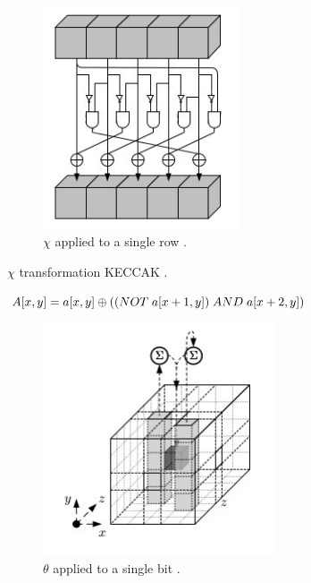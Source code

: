   \begin{figure}
    \begin{center}
      \includegraphics[width=2.3in]{keccakchi.jpg}
    \end{center}
    \caption{$\chi$ applied to a single row \cite{00015}.}
    \label{fig:lab}
  \end{figure}

  \begin{algorithm}
    \caption{ $\chi$ transformation KECCAK \cite{00015}.}
    \begin{algorithmic}[1]
      $A[x, y] = a[x, y] \oplus ((NOT \thickspace a[x + 1, y]) \thickspace AND \thickspace a[x + 2, y])$
      \EndFor
      \EndFor
    \end{algorithmic}
  \end{algorithm}
  
  \begin{figure}
    \begin{center}
      \includegraphics[width=2.7in]{keccaktheta.jpg}
    \end{center}
    \caption{$\theta$ applied to a single bit \cite{00015}.}
    \label{fig:lab}
  \end{figure}

